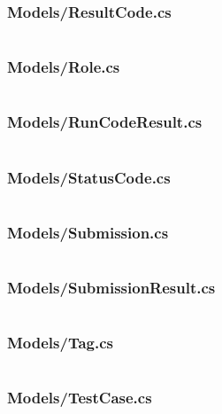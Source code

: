 \documentclass[a4paper]{report}
\begin{document}
\subsubsection{Models/ResultCode.cs}

\inputminted{csharp}{"../src/Algorithm Dynamics.Core/Models/ResultCode.cs"}

\subsubsection{Models/Role.cs}

\inputminted{csharp}{"../src/Algorithm Dynamics.Core/Models/Role.cs"}

\subsubsection{Models/RunCodeResult.cs}

\inputminted{csharp}{"../src/Algorithm Dynamics.Core/Models/RunCodeResult.cs"}

\subsubsection{Models/StatusCode.cs}

\inputminted{csharp}{"../src/Algorithm Dynamics.Core/Models/StatusCode.cs"}

\subsubsection{Models/Submission.cs}

\inputminted{csharp}{"../src/Algorithm Dynamics.Core/Models/Submission.cs"}

\subsubsection{Models/SubmissionResult.cs}

\inputminted{csharp}{"../src/Algorithm Dynamics.Core/Models/SubmissionResult.cs"}

\subsubsection{Models/Tag.cs}

\inputminted{csharp}{"../src/Algorithm Dynamics.Core/Models/Tag.cs"}

\subsubsection{Models/TestCase.cs}
\end{document}
